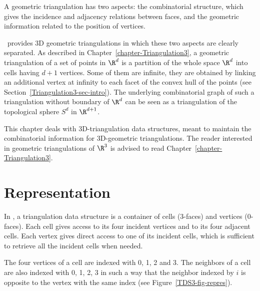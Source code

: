%



A geometric triangulation has two aspects: the combinatorial structure, which
gives the incidence and adjacency relations between faces, and the
geometric information related to the position of vertices.

\cgal\ provides 3D geometric triangulations in which these
two aspects are clearly separated.
As described in Chapter~\ref{chapter-Triangulation3}, a geometric
triangulation of a set of points in $\R^d$ is a partition of the
whole space $\R^d$ into cells having $d+1$ vertices. Some of them
are infinite, they are obtained by linking an additional vertex at
infinity to each facet of the convex hull of the points (see
Section~\ref{Triangulation3-sec-intro}).  
The underlying combinatorial graph of such a triangulation
without boundary of $\R^d$ can be seen as a triangulation of the
topological sphere $S^d$ in $\R^{d+1}$. 

This chapter deals with 3D-triangulation data structures, meant to
maintain the combinatorial information for 3D-geometric
triangulations. The reader interested in geometric triangulations of
$\R^3$ is advised to read Chapter~\ref{chapter-Triangulation3}.

\section{Representation}
\label{TDS3-sec-intro}

In \cgal, a triangulation data structure is a
container of cells ($3$-faces) and vertices ($0$-faces). Each cell gives
access to its four incident vertices and to its four adjacent
cells. Each vertex gives direct access to one of its incident cells, which is 
sufficient to retrieve all the incident cells when needed.

The four vertices of a cell are indexed with 0, 1, 2 and 3.  The
neighbors of a cell are also indexed with 0, 1, 2, 3 
in such a way that the neighbor indexed by $i$ is opposite to the vertex
with the same index (see Figure~\ref{TDS3-fig-repres}).

